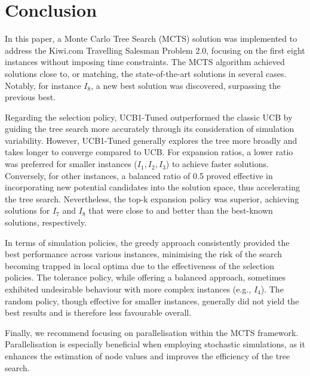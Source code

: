 
\section{Conclusion}

In this paper, a Monte Carlo Tree Search (MCTS) solution was implemented to address the Kiwi.com Travelling Salesman Problem 2.0, focusing on the first eight instances without imposing time constraints. The MCTS algorithm achieved solutions close to, or matching, the state-of-the-art solutions in several cases. Notably, for instance $I_8$, a new best solution was discovered, surpassing the previous best.

Regarding the selection policy, UCB1-Tuned outperformed the classic UCB by guiding the tree search more accurately through its consideration of simulation variability. However, UCB1-Tuned generally explores the tree more broadly and takes longer to converge compared to UCB. For expansion ratios, a lower ratio was preferred for smaller instances ($I_1, I_2, I_3$) to achieve faster solutions. Conversely, for other instances, a balanced ratio of 0.5 proved effective in incorporating new potential candidates into the solution space, thus accelerating the tree search. Nevertheless, the top-k expansion policy was superior, achieving solutions for $I_7$ and $I_8$ that were close to and better than the best-known solutions, respectively.

In terms of simulation policies, the greedy approach consistently provided the best performance across various instances, minimising the risk of the search becoming trapped in local optima due to the effectiveness of the selection policies. The tolerance policy, while offering a balanced approach, sometimes exhibited undesirable behaviour with more complex instances (e.g., $I_4$). The random policy, though effective for smaller instances, generally did not yield the best results and is therefore less favourable overall.

Finally, we recommend focusing on parallelisation within the MCTS framework. Parallelisation is especially beneficial when employing stochastic simulations, as it enhances the estimation of node values and improves the efficiency of the tree search. 